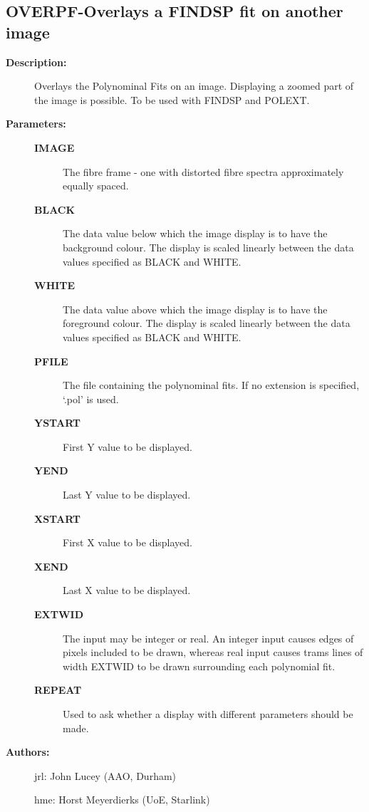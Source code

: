 \subsection{OVERPF-\label{OVERPF}Overlays a FINDSP fit on another image}
\begin{description}

\item [{\bf Description:}]
 Overlays the Polynominal Fits on  an image.
 Displaying a zoomed part of the image is possible.
 To be used with FINDSP and POLEXT.

\item [{\bf Parameters:}]
\begin{description}
\item [{\bf IMAGE}]
 The fibre frame - one with distorted fibre spectra
 approximately equally spaced.
\item [{\bf BLACK}]
 The data value below which the image display is to have the
 background colour. The display is scaled linearly between the
 data values specified as BLACK and WHITE.
\item [{\bf WHITE}]
 The data value above which the image display is to have the
 foreground colour. The display is scaled linearly between the
 data values specified as BLACK and WHITE.
\item [{\bf PFILE}]
 The file containing the polynominal fits. If no extension is
 specified, `.pol' is used.
\item [{\bf YSTART}]
 First Y value to be displayed.
\item [{\bf YEND}]
 Last Y value to be displayed.
\item [{\bf XSTART}]
 First X value to be displayed.
\item [{\bf XEND}]
 Last X value to be displayed.
\item [{\bf EXTWID}]
 The input may be integer or real. An integer input causes edges
 of pixels included to be drawn, whereas real input causes trams
 lines of width EXTWID to be drawn surrounding each polynomial
 fit.
\item [{\bf REPEAT}]
 Used to ask whether a display with different parameters should
 be made.
\end{description}

\item [{\bf Authors:}]
 jrl: John Lucey (AAO, Durham)

 hme: Horst Meyerdierks (UoE, Starlink)
\end{description}

